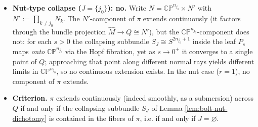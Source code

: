 \documentclass[11pt]{amsart}
\theoremstyle{plain}
\numberwithin{equation}{section}
\theoremstyle{definition}
\theoremstyle{remark}
\begin{document}
	\begin{itemize}
		\item \textbf{Nut-type collapse (}$J = \{j_0\}$\textbf{): no.} Write $N = \mathbb{CP}^{n_{j_0}} \times N'$ with $N' := \prod_{k \neq j_0} N_k$. The $N'$-component of $\pi$ extends continuously (it factors through the bundle projection $\widehat{M} \to Q \cong N'$), but the $\mathbb{CP}^{n_{j_0}}$-component does not: for each $s > 0$ the collapsing subbundle $S_J \cong S^{2n_{j_0}+1}$ inside the leaf $P_s$ maps \emph{onto} $\mathbb{CP}^{n_{j_0}}$ via the Hopf fibration, yet as $s \to 0^+$ it converges to a single point of $Q$; approaching that point along different normal rays yields different limits in $\mathbb{CP}^{n_{j_0}}$, so no continuous extension exists. In the nut case ($r = 1$), no component of $\pi$ extends.
		\item \textbf{Criterion.} $\pi$ extends continuously (indeed smoothly, as a submersion) across $Q$ if and only if the collapsing subbundle $S_J$ of Lemma \ref{lem:bolt-nut-dichotomy} is contained in the fibers of $\pi$, i.e. if and only if $J = \varnothing$.
	\end{itemize}
	
\end{document}

